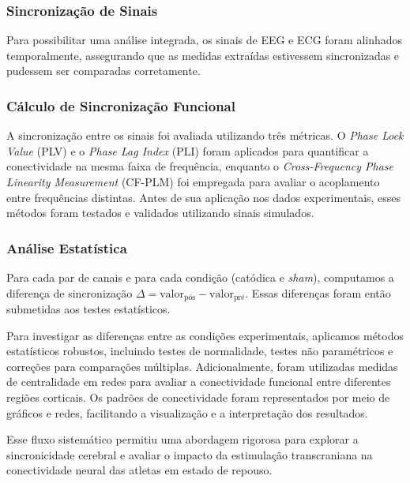 \subsubsection{Sincronização de Sinais}
Para possibilitar uma análise integrada, os sinais de EEG e ECG foram alinhados temporalmente, assegurando que as medidas extraídas estivessem sincronizadas e pudessem ser comparadas corretamente.

\subsubsection{Cálculo de Sincronização Funcional}
A sincronização entre os sinais foi avaliada utilizando três métricas. O \textit{Phase Lock Value} (PLV) e o \textit{Phase Lag Index} (PLI) foram aplicados para quantificar a conectividade na mesma faixa de frequência, enquanto o \textit{Cross-Frequency Phase Linearity Measurement} (CF-PLM) foi empregada para avaliar o acoplamento entre frequências distintas. Antes de sua aplicação nos dados experimentais, esses métodos foram testados e validados utilizando sinais simulados.

\subsubsection{Análise Estatística} 
Para cada par de canais e para cada condição (catódica e \textit{sham}), computamos a diferença de sincronização \(\Delta = \text{valor}_{\text{pós}} - \text{valor}_{\text{pré}}\). Essas diferenças foram então submetidas aos testes estatísticos.

Para investigar as diferenças entre as condições experimentais, aplicamos métodos estatísticos robustos, incluindo testes de normalidade, testes não paramétricos e correções para comparações múltiplas. Adicionalmente, foram utilizadas medidas de centralidade em redes para avaliar a conectividade funcional entre diferentes regiões corticais. Os padrões de conectividade foram representados por meio de gráficos e redes, facilitando a visualização e a interpretação dos resultados.

Esse fluxo sistemático permitiu uma abordagem rigorosa para explorar a sincronicidade cerebral e avaliar o impacto da estimulação transcraniana na conectividade neural das atletas em estado de repouso.
